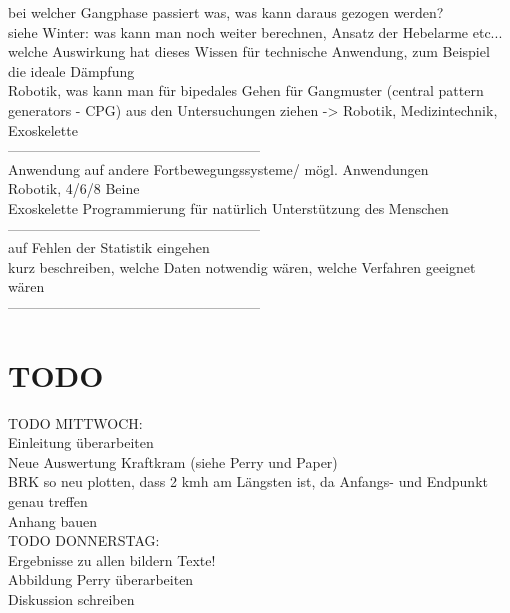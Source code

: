 bei welcher Gangphase passiert was, was kann daraus gezogen werden?\\
siehe Winter: was kann man noch weiter berechnen, Ansatz der Hebelarme etc...\\
welche Auswirkung hat dieses Wissen für technische Anwendung, zum Beispiel die ideale Dämpfung\\
Robotik, was kann man für bipedales Gehen für Gangmuster (central pattern generators - CPG) aus den Untersuchungen ziehen -> Robotik, Medizintechnik, Exoskelette\\
------------------------------------------------------\\
Anwendung auf andere Fortbewegungssysteme/ mögl. Anwendungen\\
Robotik, 4/6/8 Beine\\
Exoskelette Programmierung für natürlich Unterstützung des Menschen\\
------------------------------------------------------\\
auf Fehlen der Statistik eingehen\\
kurz beschreiben, welche Daten notwendig wären, welche Verfahren geeignet wären\\
------------------------------------------------------\\


\section{TODO}


TODO MITTWOCH:\\
Einleitung überarbeiten\\
Neue Auswertung Kraftkram (siehe Perry und Paper)\\
BRK so neu plotten, dass 2 kmh am Längsten ist, da Anfangs- und Endpunkt genau treffen\\
Anhang bauen\\

TODO DONNERSTAG:\\
Ergebnisse zu allen bildern Texte!\\
Abbildung Perry überarbeiten\\
Diskussion schreiben\\


